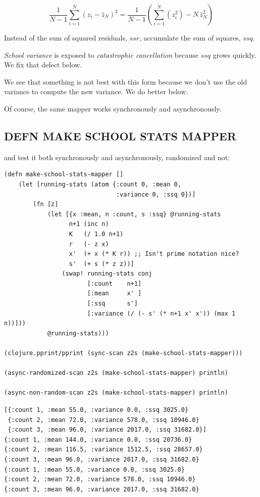 \documentclass[10pt,oneside,x11names]{article}
\begin{document}
$$\frac{1}{N-1}\sum\limits_{i=1}^{N}\left({z_i-\bar{z}_N}\right)^2 =
\frac{1}{N-1}\left(\sum\limits_{i=1}^{N}\left(z_i^2\right)-N\,{\bar{z}_N^2}\right)$$

Instead of the sum of squared residuals, \(ssr\), accumulate the sum of
squares, \(ssq\).

\emph{School variance} is exposed to \emph{catastrophic cancellation} because
\(ssq\) grows quickly. We fix that defect below.

We see that something is not best with this form because we don't use
the old variance to compute the new variance. We do better below.

Of course, the same mapper works synchronously and asynchronously.

\subsection{DEFN MAKE SCHOOL STATS MAPPER}
\label{make-school-stats-mapper}
and test it both synchronously and asynchronously, randomized and not:

\begin{verbatim}
(defn make-school-stats-mapper []
    (let [running-stats (atom {:count 0, :mean 0,
                               :variance 0, :ssq 0})]
        (fn [z]
            (let [{x :mean, n :count, s :ssq} @running-stats
                  n+1 (inc n)
                  K   (/ 1.0 n+1)
                  r   (- z x)
                  x'  (+ x (* K r)) ;; Isn't prime notation nice?
                  s'  (+ s (* z z))]
                (swap! running-stats conj
                       [:count    n+1]
                       [:mean     x' ]
                       [:ssq      s']
                       [:variance (/ (- s' (* n+1 x' x')) (max 1 n))]))
            @running-stats)))

(clojure.pprint/pprint (sync-scan z2s (make-school-stats-mapper)))

(async-randomized-scan z2s (make-school-stats-mapper) println)

(async-non-random-scan z2s (make-school-stats-mapper) println)
\end{verbatim}

\begin{verbatim}
[{:count 1, :mean 55.0, :variance 0.0, :ssq 3025.0}
 {:count 2, :mean 72.0, :variance 578.0, :ssq 10946.0}
 {:count 3, :mean 96.0, :variance 2017.0, :ssq 31682.0}]
{:count 1, :mean 144.0, :variance 0.0, :ssq 20736.0}
{:count 2, :mean 116.5, :variance 1512.5, :ssq 28657.0}
{:count 3, :mean 96.0, :variance 2017.0, :ssq 31682.0}
{:count 1, :mean 55.0, :variance 0.0, :ssq 3025.0}
{:count 2, :mean 72.0, :variance 578.0, :ssq 10946.0}
{:count 3, :mean 96.0, :variance 2017.0, :ssq 31682.0}
\end{verbatim}
\end{document}
